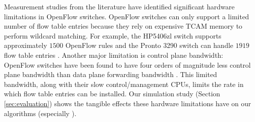 Measurement studies from the literature \cite{Curtis11,Rotsos12} have identified significant hardware limitations in OpenFlow switches.
OpenFlow switches can only support a limited number of flow table entries because they 
rely on expensive TCAM memory to perform wildcard matching.  For example, the HP5406zl switch supports approximately $1500$ OpenFlow rules \cite{Curtis11} and the Pronto 3290 switch
can handle $1919$ flow table entries \cite{Ferguson13}. 
Another major limitation is control plane bandwidth: OpenFlow switches have been found to have four orders of magnitude less control plane bandwidth than data plane 
forwarding bandwidth \cite{Curtis11}. This limited bandwidth, along with their slow control/management CPUs, limits the rate in which flow table entries can be installed.  
Our simulation study (Section \ref{sec:evaluation}) shows the tangible effects these hardware limitations have on our algorithms (especially \pcnts).



